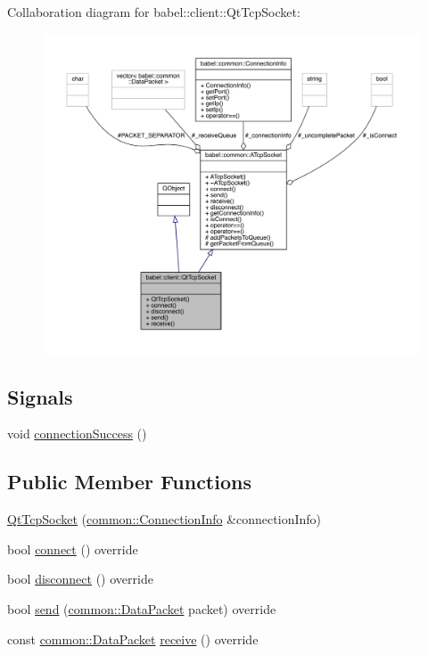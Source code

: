 Collaboration diagram for babel\+:\+:client\+:\+:Qt\+Tcp\+Socket\+:\nopagebreak
\begin{figure}[H]
\begin{center}
\leavevmode
\includegraphics[width=350pt]{classbabel_1_1client_1_1_qt_tcp_socket__coll__graph}
\end{center}
\end{figure}
\subsection*{Signals}
\begin{DoxyCompactItemize}
\item 
void \mbox{\hyperlink{classbabel_1_1client_1_1_qt_tcp_socket_aa9d5552a4dcfe25f54659022a5b34f3c}{connection\+Success}} ()
\end{DoxyCompactItemize}
\subsection*{Public Member Functions}
\begin{DoxyCompactItemize}
\item 
\mbox{\hyperlink{classbabel_1_1client_1_1_qt_tcp_socket_a04823a8dc4692ac9ff6c0ba1c40db7ac}{Qt\+Tcp\+Socket}} (\mbox{\hyperlink{classbabel_1_1common_1_1_connection_info}{common\+::\+Connection\+Info}} \&connection\+Info)
\item 
bool \mbox{\hyperlink{classbabel_1_1client_1_1_qt_tcp_socket_a61e2297c813f090a97dc49d0c2a8c2c3}{connect}} () override
\item 
bool \mbox{\hyperlink{classbabel_1_1client_1_1_qt_tcp_socket_a16d6be985545aaa0376250896accc586}{disconnect}} () override
\item 
bool \mbox{\hyperlink{classbabel_1_1client_1_1_qt_tcp_socket_a8f6bdb14b7b6742f11cf1d9e4e39e09d}{send}} (\mbox{\hyperlink{classbabel_1_1common_1_1_data_packet}{common\+::\+Data\+Packet}} packet) override
\item 
const \mbox{\hyperlink{classbabel_1_1common_1_1_data_packet}{common\+::\+Data\+Packet}} \mbox{\hyperlink{classbabel_1_1client_1_1_qt_tcp_socket_ac79df4ffe6efc050afe567c596754e5c}{receive}} () override
\end{DoxyCompactItemize}
